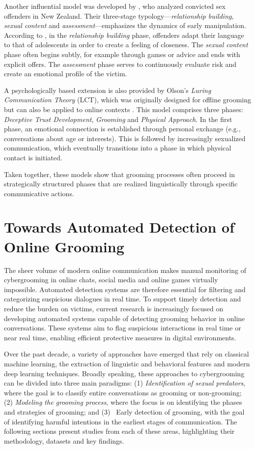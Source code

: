 Another influential model was developed by \textcite{williamsmodel}, who analyzed convicted sex offenders in New Zealand. Their three-stage typology—\emph{relationship building}, \emph{sexual content} and \emph{assessment}—emphasizes the dynamics of early manipulation. According to \textcite{williamsmodel}, in the \emph{relationship building} phase, offenders adapt their language to that of adolescents in order to create a feeling of closeness. The \emph{sexual content} phase often begins subtly, for example through games or advice and ends with explicit offers. The \emph{assessment} phase serves to continuously evaluate risk and create an emotional profile of the victim.

A psychologically based extension is also provided by Olson's \emph{Luring Communication Theory} (LCT), which was originally designed for offline grooming but can also be applied to online contexts \parencite{Cano2014}. This model comprises three phases: \emph{Deceptive Trust Development}, \emph{Grooming} and \emph{Physical Approach}. In the first phase, an emotional connection is established through personal exchange (e.g., conversations about age or interests). This is followed by increasingly sexualized communication, which eventually transitions into a phase in which physical contact is initiated.

Taken together, these models show that grooming processes often proceed in strategically structured phases that are realized linguistically through specific communicative actions. %

\section{Towards Automated Detection of Online Grooming}

The sheer volume of modern online communication makes manual monitoring of cybergrooming in online chats, social media and online games virtually impossible. Automated detection systems are therefore essential for filtering and categorizing suspicious dialogues in real time. \cite{hamm2025llms}
To support timely detection and reduce the burden on victims, current research is increasingly focused on developing automated systems capable of detecting grooming behavior in online conversations. These systems aim to flag suspicious interactions in real time or near real time, enabling efficient protective measures in digital environments.

Over the past decade, a variety of approaches have emerged that rely on classical machine learning, the extraction of linguistic and behavioral features and modern deep learning techniques. Broadly speaking, these approaches to cybergrooming can be divided into three main paradigms: (1) \textit{Identification of sexual predators}, where the goal is to classify entire conversations as grooming or non-grooming; (2) \textit{Modeling the grooming process}, where the focus is on identifying the phases and strategies of grooming; and (3) \ Early detection of grooming, with the goal of identifying harmful intentions in the earliest stages of communication. The following sections present studies from each of these areas, highlighting their methodology, datasets and key findings. %

